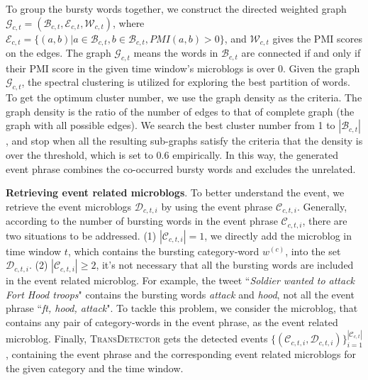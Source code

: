 \documentclass[runningheads,a4paper]{llncs}
\theoremstyle{exampstyle}
\begin{document}
To group the bursty words together, we  construct the directed weighted graph \(\mathcal{G}_{c,t}=(\mathcal{B}_{c,t},\mathcal{E}_{c,t},\mathcal{W}_{c,t})\), where \(\mathcal{E}_{c,t}=\{(a,b)|a \in \mathcal{B}_{c,t}, b \in \mathcal{B}_{c,t}, PMI(a,b)>0 \}\), and \(\mathcal{W}_{c,t}\) gives the PMI scores on the edges.
The graph \(\mathcal{G}_{c,t}\) means the words in \(\mathcal{B}_{c,t}\) are connected if and only if their PMI score in the given time window's microblogs is over 0. 
Given the graph \(\mathcal{G}_{c,t}\), the spectral clustering\cite{von2007tutorial} is utilized for exploring the best partition of words. 
To get the optimum cluster number, we use the graph density as the criteria.
The graph density is the ratio of the number of edges to that of complete graph (the graph with all possible edges). 
We search the best cluster number from 1 to \(|\mathcal{B}_{c,t}|\), and stop when all the resulting sub-graphs satisfy the criteria that the density is over the threshold, which is set to 0.6 empirically.
In this way, the generated event phrase combines the co-occurred bursty words and excludes the unrelated. 


\textbf{Retrieving event related microblogs}. 
To better understand the event, we retrieve the event microblogs \(\mathcal{D}_{c,t,i}\) by using the event phrase \(\mathcal{C}_{c,t,i}\).
Generally, according to the number of bursting words in the event phrase \(\mathcal{C}_{c,t,i}\), there are two situations to be addressed. 
(1) \(|\mathcal{C}_{c,t,i}|=1\), we directly add the microblog in time window \(t\), which contains the bursting category-word \(w^{(c)}\), into the set \(\mathcal{D}_{c,t,i}\).
(2) \(|\mathcal{C}_{c,t,i}|\geq 2\), it's not necessary that all the bursting words are included in the event related microblog.
For example, the tweet ``\textit{Soldier wanted to attack Fort Hood troops}" contains the bursting words \textit{attack} and \textit{hood}, not all the event phrase ``\textit{ft, hood, attack}". 
To tackle this problem, we consider the microblog, that contains any pair of category-words in the event phrase, as the event related microblog. 
Finally, \textsc{TransDetector} gets the detected events \(\{(\mathcal{C}_{c,t,i},\mathcal{D}_{c,t,i})\}_{i=1}^{|\mathcal{C}_{c,t}|}\), containing the event phrase and the corresponding event related microblogs for the given category and the time window.

\end{document}
